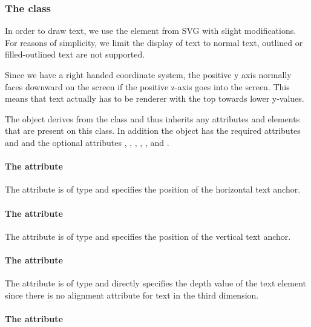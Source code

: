 \subsubsection{The  class}
\label{text-class}

In order to draw text, we use the  element from SVG with slight 
modifications. For reasons of simplicity, we limit the display of text to normal text, 
outlined or filled-outlined text are not supported.

Since we have a right handed coordinate system, the positive y axis normally faces downward on the screen if the positive
z-axis goes into the screen. This means that text actually has to be renderer with the top towards lower y-values.


The \Text object derives from the \GraphicalPrimitiveOneD class and thus
inherits any attributes and elements that are present on this class.
In addition the \Text object has the required attributes  and  and the optional attributes , , , , ,  and .

\paragraph{The \fixttspace{} attribute}

The  attribute is of type
\RelAbsVector and specifies the position of the horizontal text anchor.

\paragraph{The \fixttspace{} attribute}

The  attribute is of type
\RelAbsVector and specifies the position of the vertical text anchor.

\paragraph{The \fixttspace{} attribute}

The  attribute is of type
\RelAbsVector and directly specifies the depth value of the text element since there is no alignment attribute for text in the third dimension.

\paragraph{The \fixttspace{} attribute}

